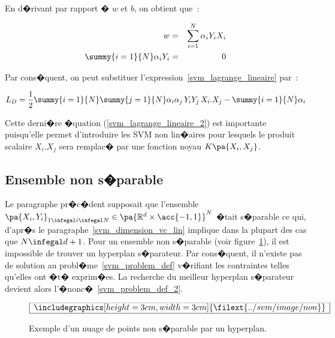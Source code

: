 En d�rivant par rapport � $w$ et $b$, on obtient que~:

        \begin{eqnarray}
        w                                                     &=& \sum_{i=1}^N \alpha_i Y_i X_i \\
        \summy{i=1}{N} \alpha_i Y_i &=& 0
        \end{eqnarray}
        
Par cons�quent, on peut substituer l'expression~\ref{svm_lagrange_lineaire} par~:

            \begin{eqnarray}
            L_D = \frac{1}{2} \summy{i=1}{N}\summy{j=1}{N} 
                                \alpha_i \alpha_j \, Y_i Y_j \, X_i . X_j - 
                                \summy{i=1}{N} \alpha_i
            \label{svm_lagrange_lineaire_2}
            \end{eqnarray}

Cette derni�re �quation (\ref{svm_lagrange_lineaire_2}) est importante puisqu'elle permet d'introduire les SVM non lin�aires pour lesquels le produit scalaire $X_i. X_j$ sera remplac� par une fonction noyau $K\pa{X_i, X_j}$. 




\subsection{Ensemble non s�parable}

Le paragraphe pr�c�dent supposait que l'ensemble $\pa{X_i,Y_i}_{1 \infegal i \infegal N} \in \pa{ \mathbb{R}^d \times \acc{-1,1} }^N$ �tait s�parable ce qui, d'apr�s le paragraphe~\ref{svm_dimension_vc_lin} implique dans la plupart des cas que $N \infegal d+1$. Pour un ensemble non s�parable (voir figure~\ref{svm_non_separable_fig}), il est impossible de trouver un hyperplan s�parateur. Par cons�quent, il n'existe pas de solution au probl�me~\ref{svm_problem_def} v�rifiant les contraintes telles qu'elles ont �t� exprim�es. La recherche du meilleur hyperplan s�parateur devient alors l'�nonc�~\ref{svm_problem_def_2}.


        \begin{figure}[ht]
    $$\frame{$\begin{array}[c|c]{c}\includegraphics[height=3cm, width=3cm]
    {\filext{../svm/image/non}}\end{array}$}$$
    \caption{    Exemple d'un nuage de points non s�parable par un hyperplan.}
    \label{svm_non_separable_fig}
        \end{figure}



